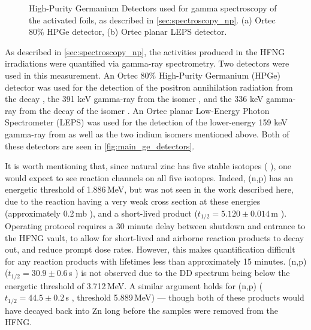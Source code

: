 \begin{figure}
    \centering
    \caption{High-Purity Germanium Detectors used for gamma spectroscopy of the activated foils, as described in \autoref{sec:spectroscopy_np}. (a) Ortec 80\% HPGe detector, (b) Ortec planar LEPS detector.}
     \label{fig:main_ge_detectors}
\end{figure}



As described in \autoref{sec:spectroscopy_np}, the activities produced in the HFNG irradiations were quantified via gamma-ray spectrometry.
Two detectors were used in this measurement.
An Ortec 80\% High-Purity Germanium (HPGe) detector was used for the detection of the positron annihilation radiation from the   decay \cite{Singh2007}, the 391 keV gamma-ray from the   isomer \cite{Blachot2010a}, and the 336 keV gamma-ray from the decay of the   isomer \cite{Blachot2012}.
An Ortec planar Low-Energy Photon Spectrometer (LEPS)  was used for the detection of the lower-energy 159 keV gamma-ray from  \cite{Burrows2007} as well as the two indium isomers mentioned above.
Both of these detectors are seen in \autoref{fig:main_ge_detectors}.




It is worth mentioning that, since natural zinc has five stable isotopes ( \cite{Meija2016}), one would expect to see  
reaction channels on all five isotopes. 
Indeed, (n,p) has an energetic threshold of 1.886\,MeV, but was not seen in the work described here, due to the reaction having a very weak cross section at these energies  (approximately 0.2\,mb \cite{Smith1980}), and a short-lived product ($t_{1/2}=5.120\pm0.014$\,m \cite{Browne2010a}).
Operating protocol requires a 30 minute delay between shutdown and entrance to the HFNG vault, to allow for short-lived and airborne reaction products to decay out, and reduce prompt dose rates.
However, this makes quantification difficult for any reaction products with lifetimes less than approximately 15 minutes. 
(n,p) ($t_{1/2}=30.9\pm0.6$\,s \cite{McCutchan2012}) is not observed due to the DD spectrum being below the energetic threshold of 3.712\,MeV.
A similar argument holds for (n,p) ($t_{1/2}=44.5\pm0.2$\,s \cite{Gurdal2016}, threshold 5.889\,MeV) --- though both of these products would have decayed back into Zn long before the samples were removed from the HFNG.


